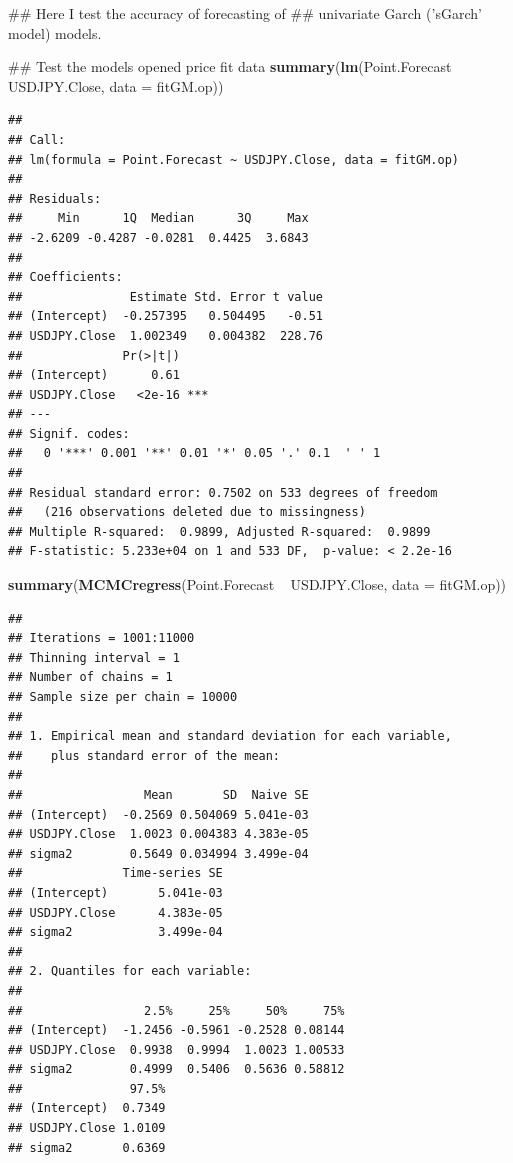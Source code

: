 \documentclass[]{tufte-book}
\newenvironment{Shaded}{}{}
\newcommand{\KeywordTok}[1]{\textcolor[rgb]{0.00,0.44,0.13}{\textbf{#1}}}
\newcommand{\DataTypeTok}[1]{\textcolor[rgb]{0.56,0.13,0.00}{#1}}
\newcommand{\StringTok}[1]{\textcolor[rgb]{0.25,0.44,0.63}{#1}}
\newcommand{\OperatorTok}[1]{\textcolor[rgb]{0.40,0.40,0.40}{#1}}
\newcommand{\NormalTok}[1]{#1}
\begin{document}
\begin{Shaded}
\begin{Highlighting}[]
\NormalTok{## Here I test the accuracy of forecasting of}
\NormalTok{## univariate Garch ('sGarch' model) models.}

\NormalTok{## Test the models opened price fit data}
\KeywordTok{summary}\NormalTok{(}\KeywordTok{lm}\NormalTok{(Point.Forecast }\OperatorTok{~}\StringTok{ }\NormalTok{USDJPY.Close, }\DataTypeTok{data =}\NormalTok{ fitGM.op))}
\end{Highlighting}
\end{Shaded}

\begin{verbatim}
## 
## Call:
## lm(formula = Point.Forecast ~ USDJPY.Close, data = fitGM.op)
## 
## Residuals:
##     Min      1Q  Median      3Q     Max 
## -2.6209 -0.4287 -0.0281  0.4425  3.6843 
## 
## Coefficients:
##               Estimate Std. Error t value
## (Intercept)  -0.257395   0.504495   -0.51
## USDJPY.Close  1.002349   0.004382  228.76
##              Pr(>|t|)    
## (Intercept)      0.61    
## USDJPY.Close   <2e-16 ***
## ---
## Signif. codes:  
##   0 '***' 0.001 '**' 0.01 '*' 0.05 '.' 0.1  ' ' 1
## 
## Residual standard error: 0.7502 on 533 degrees of freedom
##   (216 observations deleted due to missingness)
## Multiple R-squared:  0.9899, Adjusted R-squared:  0.9899 
## F-statistic: 5.233e+04 on 1 and 533 DF,  p-value: < 2.2e-16
\end{verbatim}

\begin{Shaded}
\begin{Highlighting}[]
\KeywordTok{summary}\NormalTok{(}\KeywordTok{MCMCregress}\NormalTok{(Point.Forecast }\OperatorTok{~}\StringTok{ }\NormalTok{USDJPY.Close, }
    \DataTypeTok{data =}\NormalTok{ fitGM.op))}
\end{Highlighting}
\end{Shaded}

\begin{verbatim}
## 
## Iterations = 1001:11000
## Thinning interval = 1 
## Number of chains = 1 
## Sample size per chain = 10000 
## 
## 1. Empirical mean and standard deviation for each variable,
##    plus standard error of the mean:
## 
##                 Mean       SD  Naive SE
## (Intercept)  -0.2569 0.504069 5.041e-03
## USDJPY.Close  1.0023 0.004383 4.383e-05
## sigma2        0.5649 0.034994 3.499e-04
##              Time-series SE
## (Intercept)       5.041e-03
## USDJPY.Close      4.383e-05
## sigma2            3.499e-04
## 
## 2. Quantiles for each variable:
## 
##                 2.5%     25%     50%     75%
## (Intercept)  -1.2456 -0.5961 -0.2528 0.08144
## USDJPY.Close  0.9938  0.9994  1.0023 1.00533
## sigma2        0.4999  0.5406  0.5636 0.58812
##               97.5%
## (Intercept)  0.7349
## USDJPY.Close 1.0109
## sigma2       0.6369
\end{verbatim}
\end{document}
